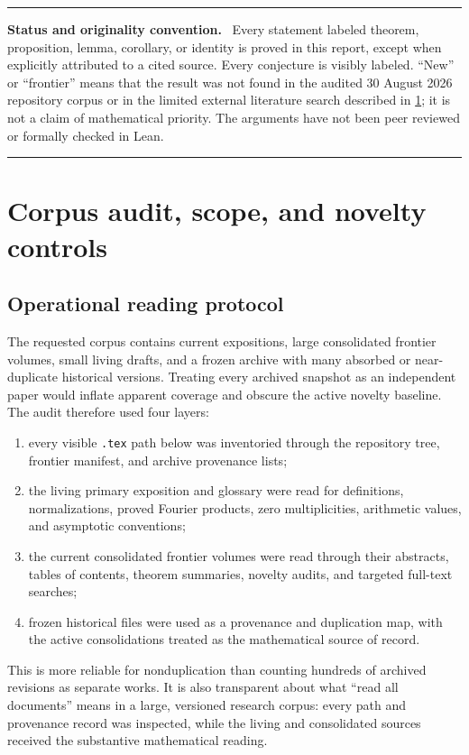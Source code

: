 \documentclass[11pt,oneside]{article}
\theoremstyle{definition}
\theoremstyle{remark}
\numberwithin{equation}{section}
\newcommand{\1}{\mathbf 1}
\newenvironment{statusbox}[1]{%
  \par\smallskip\noindent\begin{center}\begin{minipage}{0.94\textwidth}%
  \hrule\vspace{0.55em}\textbf{#1.}\ }{%
  \vspace{0.55em}\hrule\end{minipage}\end{center}\smallskip}
\begin{document}
\begin{statusbox}{Status and originality convention}
Every statement labeled theorem, proposition, lemma, corollary, or identity is proved in
this report, except when explicitly attributed to a cited source.  Every conjecture is
visibly labeled.  ``New'' or ``frontier'' means that the result was not found in the audited
30 August 2026 repository corpus or in the limited external literature search described
in \cref{sec:audit}; it is not a claim of mathematical priority.  The arguments have not
been peer reviewed or formally checked in Lean.
\end{statusbox}

\tableofcontents
\clearpage

\section{Corpus audit, scope, and novelty controls}
\label{sec:audit}

\subsection{Operational reading protocol}

The requested corpus contains current expositions, large consolidated frontier volumes,
small living drafts, and a frozen archive with many absorbed or near-duplicate historical
versions.  Treating every archived snapshot as an independent paper would inflate apparent
coverage and obscure the active novelty baseline.  The audit therefore used four layers:
\begin{enumerate}
\item every visible \texttt{.tex} path below
 was inventoried through the repository tree,
frontier manifest, and archive provenance lists;
\item the living primary exposition and glossary were read for definitions, normalizations,
proved Fourier products, zero multiplicities, arithmetic values, and asymptotic conventions;
\item the current consolidated frontier volumes were read through their abstracts, tables of
contents, theorem summaries, novelty audits, and targeted full-text searches;
\item frozen historical files were used as a provenance and duplication map, with the active
consolidations treated as the mathematical source of record.
\end{enumerate}
This is more reliable for nonduplication than counting hundreds of archived revisions as
separate works.  It is also transparent about what ``read all documents'' means in a large,
versioned research corpus: every path and provenance record was inspected, while the living
and consolidated sources received the substantive mathematical reading.
\end{document}
